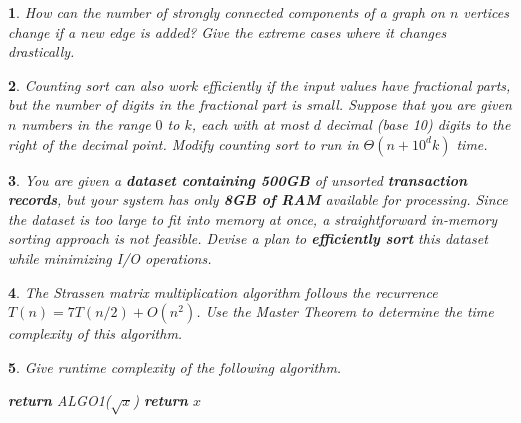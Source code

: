 \documentclass[%
addpoints]{exam}
\theoremstyle{problem}
\newtheorem{p}{}
\begin{document}
\begin{p} 
    How can the number of strongly connected components of a graph on $n$ vertices change if a new edge is added? Give the extreme cases where it changes 
    drastically.
\hfill  
\end{p}
    

\begin{p} 
    Counting sort can also work efficiently if the input values have fractional parts, but the number of digits in the fractional part is small. Suppose that you are given \( n \) numbers in the range \( 0 \) to \( k \), each with at most \( d \) decimal (base 10) digits to the right of the decimal point. Modify counting sort to run in \( \Theta(n + 10^d k) \) time.  
\hfill  
\end{p}


\begin{p}
    You are given a \textbf{dataset containing 500GB} of unsorted \textbf{transaction records}, but your system has only \textbf{8GB of RAM} available for processing. Since the dataset is too large to fit into memory at once, a straightforward in-memory sorting approach is not feasible. Devise a plan to \textbf{efficiently sort} this dataset while minimizing I/O operations.
\hfill
\end{p}


\begin{p}
    The Strassen matrix multiplication algorithm follows the recurrence \(T(n) = 7T(n/2) + O(n^2)\). Use the Master Theorem to determine the time complexity of this algorithm.  
\hfill
\end{p}

\begin{p}
    Give runtime complexity of the following algorithm.
    \begin{algorithm}[!h]
        \label{algo1}
        \begin{algorithmic}
             
            \State \textbf{return} ALGO1($\sqrt{x}$)
            \Else
            \State \textbf{return} $x$
            \EndIf
            \EndProcedure
        \end{algorithmic}
    \end{algorithm}
\hfill 
\end{p}
\end{document}
